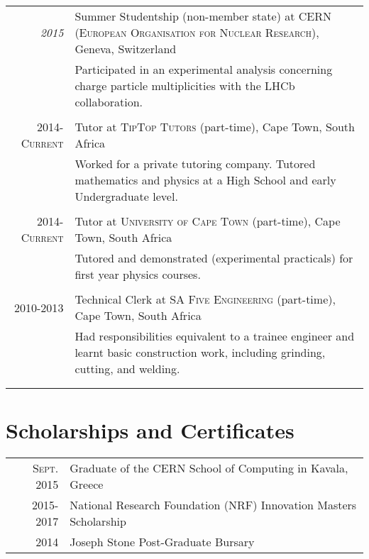 \documentclass[a4paper,10pt]{article} %
\begin{document}
\begin{tabular}{r|p{11cm}}
\emph{2015} & Summer Studentship (non-member state) at \textsc{CERN (European Organisation for Nuclear Research)}, Geneva, Switzerland \\
& \footnotesize{Participated in an experimental analysis concerning charge particle multiplicities with the LHCb collaboration.}\\
\multicolumn{2}{c}{} \\

\textsc{2014-Current} & Tutor at \textsc{TipTop Tutors} (part-time), Cape Town, South Africa \emph{}\\
& \footnotesize{Worked for a private tutoring company. Tutored mathematics and physics at a High School and early Undergraduate level.}\\
\multicolumn{2}{c}{} \\

\textsc{2014-Current} & Tutor at \textsc{University of Cape Town} (part-time), Cape Town, South Africa \emph{}\\
& \footnotesize{Tutored and demonstrated (experimental practicals) for first year physics courses.}\\
\multicolumn{2}{c}{} \\

\textsc{2010-2013} & Technical Clerk at \textsc{SA Five Engineering} (part-time), Cape Town, South Africa\\
& \footnotesize{Had responsibilities equivalent to a trainee engineer and learnt basic construction work, including grinding, cutting, and welding.}\\
\multicolumn{2}{c}{} \\


\multicolumn{2}{c}{} \\
\end{tabular}


\section{Scholarships and Certificates}

\begin{tabular}{rl}
\textsc{Sept.} 2015 & Graduate of the CERN School of Computing in Kavala, Greece \\

2015-2017 & National Research Foundation (NRF) Innovation Masters Scholarship \\

2014 & Joseph Stone Post-Graduate Bursary
\end{tabular}
\end{document}
